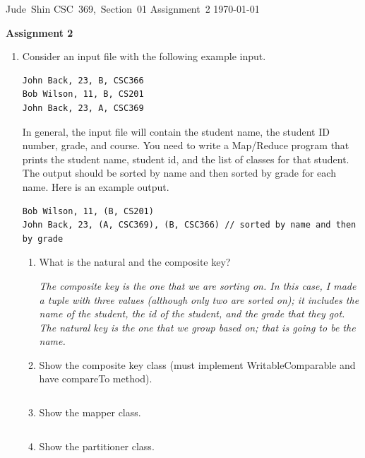 \documentclass[11pt]{article}
\begin{document}
\hfill\vbox{\hbox{Jude Shin}
		\hbox{CSC 369, Section 01}	
		\hbox{Assignment 2}	
		\hbox{\today}}\par

\bigskip
\centerline{\Large\bf Assignment 2}\par
\bigskip

\begin{enumerate}
	\item Consider an input file with the following example input. 

\begin{lstlisting}
John Back, 23, B, CSC366
Bob Wilson, 11, B, CS201
John Back, 23, A, CSC369
\end{lstlisting}

		In general, the input file will contain the student name, the student ID 
		number, grade, and course. You need to write a Map/Reduce program that 
		prints the student name, student id, and the list of classes for that 
		student. The output should be sorted by name and then sorted by grade for 
		each name. Here is an example output. 

\begin{lstlisting}
Bob Wilson, 11, (B, CS201)
John Back, 23, (A, CSC369), (B, CSC366) // sorted by name and then by grade
\end{lstlisting}

		\begin{enumerate}
			\item What is the natural and the composite key?

				\textit{The composite key is the one that we are sorting on. In this 
				case, I made a tuple with three values (although only two are sorted
				on); it includes the name of the student, the id of the student, and 
				the grade that they got. The natural key is the one that we group based 
				on; that is going to be the name.}

			\item Show the composite key class (must implement WritableComparable and 
				have compareTo method).

\begin{lstlisting}
\end{lstlisting}

			\item Show the mapper class.

\begin{lstlisting}
\end{lstlisting}

			\item Show the partitioner class.


\end{enumerate}
\end{enumerate}
\end{document}
